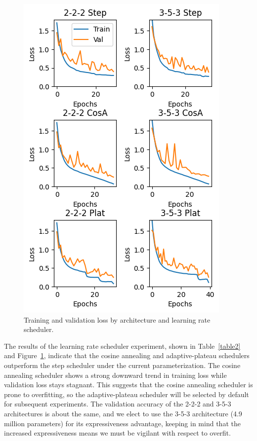 \documentclass[letterpaper]{article} %
\begin{document}
\begin{figure}[b]
\centering
\includegraphics[width=0.98\columnwidth]{experiment-lrschedule-3x2}
\caption{Training and validation loss by architecture and learning rate scheduler.}
\label{fig3}
\end{figure}


The results of the learning rate scheduler experiment, shown in Table~\ref{table2} and Figure~\ref{fig3}, indicate that
the cosine annealing and adaptive-plateau schedulers outperform the step scheduler under the current
parameterization.
The cosine annealing scheduler shows a strong downward trend in training loss while validation loss
stays stagnant.
This suggests that the cosine annealing scheduler is prone to overfitting, so the
adaptive-plateau scheduler will be selected by default for subsequent experiments.
The validation accuracy of the 2-2-2 and 3-5-3 architectures is about the same,
and we elect to use the 3-5-3 architecture (4.9 million parameters) for its expressiveness
advantage, keeping in mind that the increased expressiveness means we must be vigilant
with respect to overfit.
\end{document}
